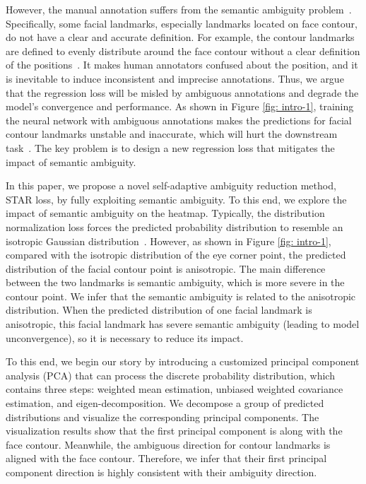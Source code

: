 \documentclass[10pt,twocolumn,letterpaper]{article}
\begin{document}
However, the manual annotation suffers from the semantic ambiguity problem~\cite{dong2018sbr, liu2019semantic, huang2021adnet}.
Specifically, some facial landmarks, especially landmarks located on face contour, do not have a clear and accurate definition.
For example, the contour landmarks are defined to evenly distribute around the face contour without a clear definition of the positions~\cite{liu2019semantic}.
It makes human annotators confused about the position, and it is inevitable to induce inconsistent and imprecise annotations. 
Thus, we argue that the regression loss will be misled by ambiguous annotations and degrade the model's convergence and performance.
As shown in Figure \ref{fig: intro-1}, training the neural network with ambiguous annotations makes the predictions for facial contour landmarks unstable and inaccurate, which will hurt the downstream task~\cite{dong2020supervision}.
The key problem is to design a new regression loss that mitigates the impact of semantic ambiguity.

In this paper, we propose a novel self-adaptive ambiguity reduction method, STAR loss, by fully exploiting semantic ambiguity.
To this end, we explore the impact of semantic ambiguity on the heatmap.
Typically, the distribution normalization loss forces the predicted probability distribution to resemble an isotropic Gaussian distribution~\cite{nibali2018numerical}.
However, as shown in Figure \ref{fig: intro-1}, compared with the isotropic distribution of the eye corner point, the predicted distribution of the facial contour point is anisotropic.
The main difference between the two landmarks is semantic ambiguity, which is more severe in the contour point.
We infer that the semantic ambiguity is related to the anisotropic distribution. 
When the predicted distribution of one facial landmark is anisotropic, this facial landmark has severe semantic ambiguity (leading to model unconvergence), so it is necessary to reduce its impact.  

To this end, we begin our story by introducing a customized principal component analysis (PCA) that can process the discrete probability distribution, which contains three steps: weighted mean estimation, unbiased weighted covariance estimation, and eigen-decomposition.
We decompose a group of predicted distributions and visualize the corresponding principal components.
The visualization results show that the first principal component is along with the face contour.
Meanwhile, the ambiguous direction for contour landmarks is aligned with the face contour.
Therefore, we infer that their first principal component direction is highly consistent with their ambiguity direction.
\end{document}
